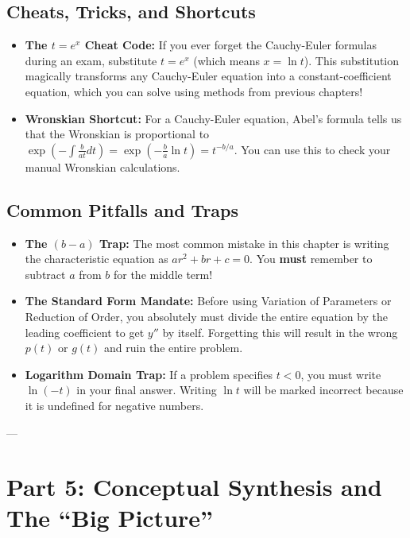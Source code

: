 \documentclass{article}
\begin{document}
\subsection{Cheats, Tricks, and Shortcuts}
\begin{itemize}
    \item \textbf{The $t = e^x$ Cheat Code:} If you ever forget the Cauchy-Euler formulas during an exam, substitute $t = e^x$ (which means $x = \ln t$). This substitution magically transforms any Cauchy-Euler equation into a constant-coefficient equation, which you can solve using methods from previous chapters!
    \item \textbf{Wronskian Shortcut:} For a Cauchy-Euler equation, Abel's formula tells us that the Wronskian is proportional to $\exp(-\int \frac{b}{at} dt) = \exp(-\frac{b}{a} \ln t) = t^{-b/a}$. You can use this to check your manual Wronskian calculations.
\end{itemize}

\subsection{Common Pitfalls and Traps}
\begin{itemize}
    \item \textbf{The $(b-a)$ Trap:} The most common mistake in this chapter is writing the characteristic equation as $ar^2 + br + c = 0$. You \textbf{must} remember to subtract $a$ from $b$ for the middle term!
    \item \textbf{The Standard Form Mandate:} Before using Variation of Parameters or Reduction of Order, you absolutely must divide the entire equation by the leading coefficient to get $y''$ by itself. Forgetting this will result in the wrong $p(t)$ or $g(t)$ and ruin the entire problem.
    \item \textbf{Logarithm Domain Trap:} If a problem specifies $t < 0$, you must write $\ln(-t)$ in your final answer. Writing $\ln t$ will be marked incorrect because it is undefined for negative numbers.
\end{itemize}

---

\section{Part 5: Conceptual Synthesis and The ``Big Picture''}
\end{document}
